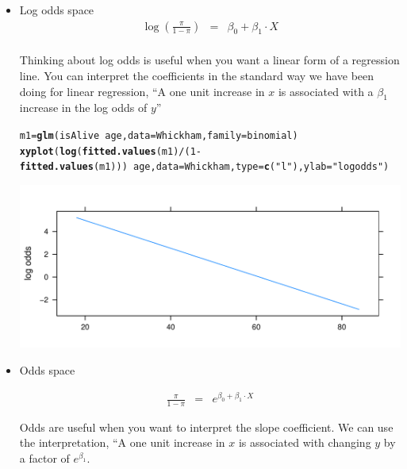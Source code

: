 \documentclass[10pt]{article}\usepackage[]{graphicx}\usepackage[]{color}
\makeatletter
\def\maxwidth{ %
  \ifdim\Gin@nat@width>\linewidth
    \linewidth
  \else
    \Gin@nat@width
  \fi
}
\newcommand{\hlnum}[1]{\textcolor[rgb]{0.686,0.059,0.569}{#1}}%
\newcommand{\hlstr}[1]{\textcolor[rgb]{0.192,0.494,0.8}{#1}}%
\newcommand{\hlopt}[1]{\textcolor[rgb]{0,0,0}{#1}}%
\newcommand{\hlstd}[1]{\textcolor[rgb]{0.345,0.345,0.345}{#1}}%
\newcommand{\hlkwb}[1]{\textcolor[rgb]{0.69,0.353,0.396}{#1}}%
\newcommand{\hlkwc}[1]{\textcolor[rgb]{0.333,0.667,0.333}{#1}}%
\newcommand{\hlkwd}[1]{\textcolor[rgb]{0.737,0.353,0.396}{\textbf{#1}}}%
\newenvironment{kframe}{%
 \def\at@end@of@kframe{}%
 \ifinner\ifhmode%
  \def\at@end@of@kframe{\end{minipage}}%
  \begin{minipage}{\columnwidth}%
 \fi\fi%
 \def\FrameCommand##1{\hskip\@totalleftmargin \hskip-\fboxsep
 \colorbox{shadecolor}{##1}\hskip-\fboxsep
     \hskip-\linewidth \hskip-\@totalleftmargin \hskip\columnwidth}%
 \MakeFramed {\advance\hsize-\width
   \@totalleftmargin\z@ \linewidth\hsize
   \@setminipage}}%
 {\par\unskip\endMakeFramed%
 \at@end@of@kframe}
\newenvironment{knitrout}{}{} %
\makeatother
\begin{document}
\begin{itemize}
\item Log odds space
	\begin{eqnarray*}
			\log \left( \frac{\pi}{1-\pi} \right) &=& \beta_0 + \beta_1\cdot X \\
		\end{eqnarray*}
		
		Thinking about log odds is useful when you want a linear form of a regression line. You can interpret the coefficients in the standard way we have been doing for linear regression, ``A one unit increase in $x$ is associated with a $\beta_1$ increase in the log odds of $y$''
		
\begin{knitrout}\footnotesize
{}\color{fgcolor}\begin{kframe}
\begin{alltt}
\hlstd{m1} \hlkwb{=} \hlkwd{glm}\hlstd{(isAlive}\hlopt{~}\hlstd{age,} \hlkwc{data}\hlstd{=Whickham,} \hlkwc{family}\hlstd{=binomial)}
\hlkwd{xyplot}\hlstd{(}\hlkwd{log}\hlstd{(}\hlkwd{fitted.values}\hlstd{(m1)}\hlopt{/}\hlstd{(}\hlnum{1}\hlopt{-}\hlkwd{fitted.values}\hlstd{(m1)))}\hlopt{~}\hlstd{age,} \hlkwc{data}\hlstd{=Whickham,} \hlkwc{type}\hlstd{=}\hlkwd{c}\hlstd{(}\hlstr{"l"}\hlstd{),}\hlkwc{ylab}\hlstd{=}\hlstr{"log odds"}\hlstd{)}
\end{alltt}
\end{kframe}
\includegraphics[width=\maxwidth]{figure/unnamed-chunk-6-1} 

\end{knitrout}
\clearpage
		\item Odds space
		
		\begin{eqnarray*}
	    \frac{\pi}{1-\pi} &=& e^{\beta_0 + \beta_1\cdot X}
		\end{eqnarray*}

Odds are useful when you want to interpret the slope coefficient. We can use the interpretation, ``A one unit increase in $x$ is associated with changing $y$ by a factor of $e^{\beta_1}$. 


\end{itemize}
\end{document}
